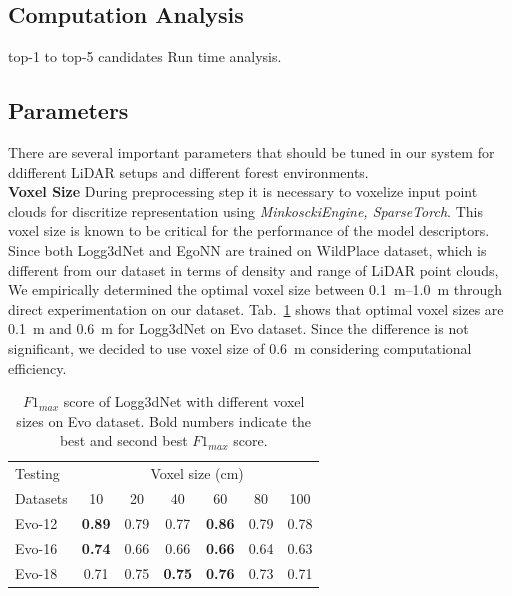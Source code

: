 \subsection*{Computation Analysis}
top-1 to top-5 candidates Run time analysis.

\subsection*{Parameters}
There are several important parameters that should be tuned in our system for ddifferent LiDAR setups and different forest environments. \\
\textbf{Voxel Size}\hspace{0.5em} During preprocessing step it is necessary to voxelize input point clouds for discritize representation using \emph{MinkosckiEngine, SparseTorch}. This voxel size is known to be critical for the performance of the model descriptors. Since both Logg3dNet and EgoNN are trained on WildPlace dataset, which is different from our dataset in terms of density and range of LiDAR point clouds, We empirically determined the optimal voxel size between \SIrange{0.1}{1.0}{\meter} through direct experimentation on our dataset. Tab.~\ref{tab:voxel_size} shows that optimal voxel sizes are \SI{0.1}{\meter} and \SI{0.6}{\meter} for Logg3dNet on Evo dataset. Since the difference is not significant, we decided to use voxel size of \SI{0.6}{\meter} considering computational efficiency.\\

\begin{table}[htbp]
  \centering
  \begin{tabular}{p{2cm} *{6}{c}}
      \toprule
      \multicolumn{1}{l}{Testing} & \multicolumn{6}{c}{Voxel size (cm)} \\
      \cmidrule{2-7}
      \multicolumn{1}{l}{Datasets} & 10 & 20 & 40 & 60 & 80 & 100 \\
      \midrule
      Evo-12 &\textbf{0.89} &0.79 &0.77 &\textbf{0.86} &0.79 &0.78 \\
      \addlinespace %
      Evo-16 & \textbf{0.74} & 0.66 & 0.66 & \textbf{0.66} & 0.64 & 0.63 \\
      \addlinespace %
      Evo-18  &0.71 & 0.75 & \textbf{0.75} & \textbf{0.76} & 0.73 & 0.71 \\
      \bottomrule
  \end{tabular}

  \caption{$F{1}_{max}$ score of Logg3dNet with different voxel sizes on Evo dataset. Bold numbers indicate the best and second best $F{1}_{max}$ score.}
  \label{tab:voxel_size}
\end{table}

